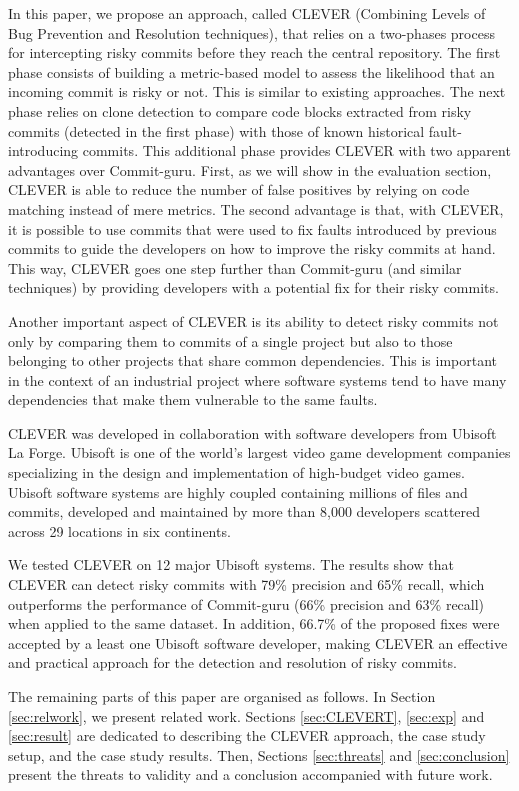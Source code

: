 \documentclass[sigconf]{acmart}
\begin{document}
In this paper, we propose an approach, called CLEVER (Combining Levels
of Bug Prevention and Resolution techniques), that relies on a
two-phases process for intercepting risky commits before they reach the
central repository. The first phase consists of building a metric-based
model to assess the likelihood that an incoming commit is risky or not.
This is similar to existing approaches. The next phase relies on clone
detection to compare code blocks extracted from risky commits (detected
in the first phase) with those of known historical fault-introducing
commits. This additional phase provides CLEVER with two apparent
advantages over Commit-guru. First, as we will show in the evaluation
section, CLEVER is able to reduce the number of false positives by
relying on code matching instead of mere metrics. The second advantage
is that, with CLEVER, it is possible to use commits that were used to
fix faults introduced by previous commits to guide the developers on how
to improve the risky commits at hand. This way, CLEVER goes one step
further than Commit-guru (and similar techniques) by providing
developers with a potential fix for their risky commits.

Another important aspect of CLEVER is its ability to detect risky
commits not only by comparing them to commits of a single project but
also to those belonging to other projects that share common
dependencies. This is important in the context of an industrial project
where software systems tend to have many dependencies that make them
vulnerable to the same faults.

CLEVER was developed in collaboration with software developers from
Ubisoft La Forge. Ubisoft is one of the world's largest video game
development companies specializing in the design and implementation of
high-budget video games. Ubisoft software systems are highly coupled
containing millions of files and commits, developed and maintained by
more than 8,000 developers scattered across 29 locations in six
continents.

We tested CLEVER on 12 major Ubisoft systems. The results show that
CLEVER can detect risky commits with 79\% precision and 65\% recall,
which outperforms the performance of Commit-guru (66\% precision and
63\% recall) when applied to the same dataset. In addition, 66.7\% of
the proposed fixes were accepted by a least one Ubisoft software
developer, making CLEVER an effective and practical approach for the
detection and resolution of risky commits.

The remaining parts of this paper are organised as follows. In Section
\ref{sec:relwork}, we present related work. Sections \ref{sec:CLEVERT},
\ref{sec:exp} and \ref{sec:result} are dedicated to describing the
CLEVER approach, the case study setup, and the case study results. Then,
Sections \ref{sec:threats} and \ref{sec:conclusion} present the threats
to validity and a conclusion accompanied with future work.
\end{document}
